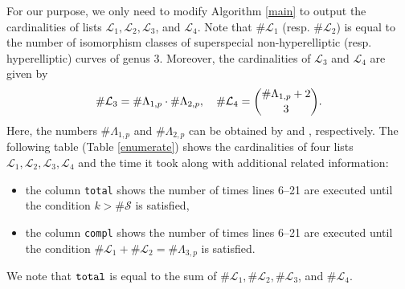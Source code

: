 \documentclass{amsart}
\theoremstyle{definition}
\theoremstyle{plain}
\begin{document}
For our purpose, we only need to modify Algorithm \ref{main} to output the cardinalities of lists $\mathcal{L}_1,\mathcal{L}_2,\mathcal{L}_3$, and $\mathcal{L}_4$.
Note that $\#\mathcal{L}_1$ (resp. $\#\mathcal{L}_2$) is equal to the number of isomorphism classes of superspecial non-hyperelliptic (resp. hyperelliptic) curves of genus 3.
Moreover, the cardinalities of $\mathcal{L}_3$ and $\mathcal{L}_4$ are given by\smallskip
\[
    \#\mathcal{L}_3 = \#\Lambda_{1,p} \cdot \#\Lambda_{2,p}, \quad \#\mathcal{L}_4 = \binom{\#\Lambda_{1,p}+2}{3}.\medskip
\]
Here, the numbers $\#\Lambda_{1,p}$ and $\#\Lambda_{2,p}$ can be obtained by \cite{Deuring} and \cite{IKO}, respectively.
The following table (Table \ref{enumerate}) shows the cardinalities of four lists $\mathcal{L}_1,\mathcal{L}_2,\mathcal{L}_3,\mathcal{L}_4$ and the time it took along with additional related information:
\begin{itemize}
\item[---] the column {\tt total} shows the number of times lines 6--21 are executed until the condition $k > \#\mathcal{S}$ is satisfied,\smallskip
\item[---] the column {\tt compl} shows the number of times lines 6--21 are executed until the condition $\#\mathcal{L}_1 + \#\mathcal{L}_2 = \#\Lambda_{3,p}$ is satisfied.
\end{itemize}
\noindent We note that ${\tt total}$ is equal to the sum of $\#\mathcal{L}_1,\#\mathcal{L}_2,\#\mathcal{L}_3$, and $\#\mathcal{L}_4$.
\end{document}
